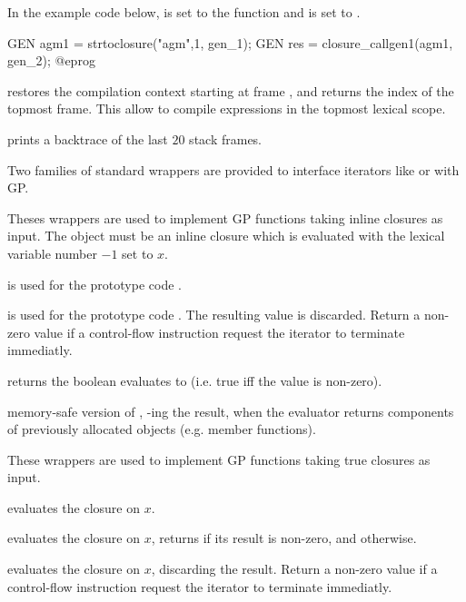 In the example code below,  is set to the function
 and  is set to .

\bprog
  GEN agm1 = strtoclosure("agm",1, gen_1);
  GEN res = closure_callgen1(agm1, gen_2);
@eprog

 restores the compilation context starting
at frame , and returns the index of the topmost frame. This allow to
compile expressions in the topmost lexical scope.

 prints a backtrace of the last $20$ stack frames.

Two families of standard wrappers are provided to interface iterators like
 or  with GP.

Theses wrappers are used to implement GP functions taking inline closures as
input. The object  must be an inline closure which is evaluated
with the lexical variable number $-1$ set to $x$.

 is used for the prototype code .

 is used for the prototype code
. The resulting value is discarded.  Return a non-zero value if a
control-flow instruction request the iterator to terminate immediatly.

 returns the boolean
 evaluates to (i.e. true iff the value is non-zero).

 memory-safe version of ,
-ing the result, when the evaluator returns components of
previously allocated objects (e.g. member functions).

These wrappers are used to implement GP functions taking true closures as
input.

 evaluates the closure  on $x$.

 evaluates the closure  on
$x$, returns  if its result is non-zero, and  otherwise.

 evaluates the closure  on
$x$, discarding the result. Return a non-zero value if a control-flow
instruction request the iterator to terminate immediatly.

